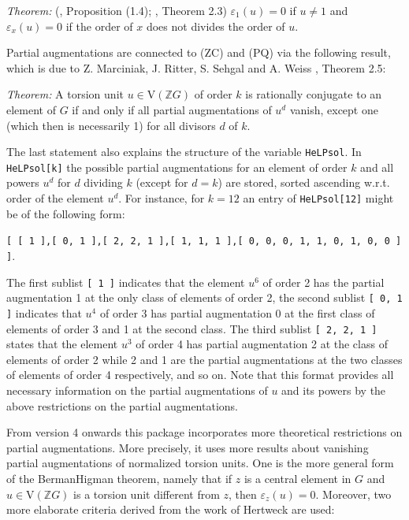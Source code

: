 \documentclass[a4paper,11pt]{report}
\begin{document}
{{ \emph{Theorem:} (\cite{SehgalBook2}, Proposition (1.4); \cite{HertweckBrauer}, Theorem 2.3) $\varepsilon_1(u) = 0$ if $u \not= 1$ and $\varepsilon_x(u) = 0$ if the order of $x$ does not divides the order of $u$. 

 Partial augmentations are connected to (ZC) and (PQ) via the following result,
which is due to Z. Marciniak, J. Ritter, S. Sehgal and A. Weiss \cite{MRSW}, Theorem 2.5: 

 \emph{Theorem:} A torsion unit $u \in \mathrm{V}(\mathbb{Z}G)$ of order $k$ is rationally conjugate to an element of $G$ if and only if all partial augmentations of $u^d$ vanish, except one (which then is necessarily 1) for all divisors $d$ of $k$.

 

 The last statement also explains the structure of the variable \texttt{HeLP{\textunderscore}sol}. In \texttt{HeLP{\textunderscore}sol[k]} the possible partial augmentations for an element of order $k$ and all powers $u^d$ for $d$ dividing $k$ (except for $d=k$) are stored, sorted ascending w.r.t. order of the element $u^d$. For instance, for $k = 12$ an entry of \texttt{HeLP{\textunderscore}sol[12]} might be of the following form:

 \texttt{[ [ 1 ],[ 0, 1 ],[ \texttt{}2, 2, 1 ],[ 1, \texttt{}1, 1
],[ 0, 0, 0, 1, \texttt{}1, 0, 1, 0, 0 ] ]}.

 The first sublist \texttt{[ 1 ]} indicates that the element $u^6$ of order 2 has the partial augmentation 1 at the only class of elements of
order 2, the second sublist \texttt{[ 0, 1 ]} indicates that $u^4$ of order 3 has partial augmentation 0 at the first class of elements of order
3 and 1 at the second class. The third sublist \texttt{[ \texttt{}2, 2, 1 ]} states that the element $u^3$ of order 4 has partial augmentation \texttt{}2 at the class of
elements of order 2 while 2 and 1 are the partial augmentations at the two
classes of elements of order 4 respectively, and so on. Note that this format
provides all necessary information on the partial augmentations of $u$ and its powers by the above restrictions on the partial augmentations.

 

 From version 4 onwards this package incorporates more theoretical restrictions
on partial augmentations. More precisely, it uses more results about vanishing
partial augmentations of normalized torsion units. One is the more general
form of the Berman\texttt{}Higman theorem, namely that if $z$ is a central element in $G$ and $u \in \mathrm{V}(\mathbb{Z}G)$ is a torsion unit different from $z$, then $\varepsilon_z(u)= 0$. Moreover, two more elaborate criteria derived from the work of Hertweck are
used:

}}
\end{document}
